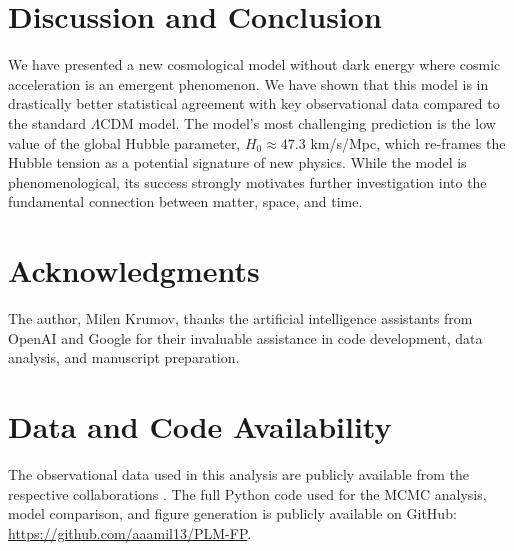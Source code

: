 \documentclass[12pt, a4paper]{article}
\begin{document}
\section{Discussion and Conclusion}
We have presented a new cosmological model without dark energy where cosmic acceleration is an emergent phenomenon. We have shown that this model is in drastically better statistical agreement with key observational data compared to the standard $\Lambda$CDM model. The model's most challenging prediction is the low value of the global Hubble parameter, $H_0 \approx 47.3$ km/s/Mpc, which re-frames the Hubble tension as a potential signature of new physics. While the model is phenomenological, its success strongly motivates further investigation into the fundamental connection between matter, space, and time.

\section*{Acknowledgments}
The author, Milen Krumov, thanks the artificial intelligence assistants from OpenAI and Google for their invaluable assistance in code development, data analysis, and manuscript preparation.

\section*{Data and Code Availability}
The observational data used in this analysis are publicly available from the respective collaborations \cite{PantheonPlus, BAO_compilation, Planck2018}. The full Python code used for the MCMC analysis, model comparison, and figure generation is publicly available on GitHub: \href{https://github.com/aaamil13/PLM-FP}{https://github.com/aaamil13/PLM-FP}.



\end{document}
